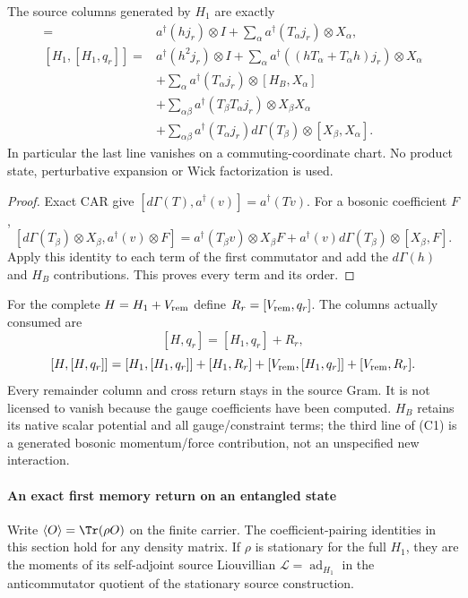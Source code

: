 \documentclass[12pt,a4paper]{article}
\begin{document}
\begin{theorem}
\label{p4:thm:v2168-bilinear-source-commutators}
The source columns generated by $H_1$ are exactly
\begin{align*}
 [H_1,q_r]={}&a^\dagger(hj_r)\otimes I
       +\sum_\alpha a^\dagger(T_\alpha j_r)\otimes X_\alpha,\\
 [H_1,[H_1,q_r]]={}&a^\dagger(h^2j_r)\otimes I
       +\sum_\alpha a^\dagger((hT_\alpha+T_\alpha h)j_r)
                   \otimes X_\alpha\\
 &+\sum_\alpha a^\dagger(T_\alpha j_r)\otimes[H_B,X_\alpha]\\
 &+\sum_{\alpha\beta}a^\dagger(T_\beta T_\alpha j_r)
                   \otimes X_\beta X_\alpha\\
 &+\sum_{\alpha\beta}a^\dagger(T_\alpha j_r)d\Gamma(T_\beta)
                   \otimes[X_\beta,X_\alpha].
 \tag{C1}
\end{align*}
In particular the last line vanishes on a commuting-coordinate chart.
No product state, perturbative expansion or Wick factorization is used.
\end{theorem}
\begin{proof}
Exact CAR give
$[d\Gamma(T),a^\dagger(v)]=a^\dagger(Tv)$. For a bosonic coefficient $F$,
\[
 [d\Gamma(T_\beta)\otimes X_\beta,
             a^\dagger(v)\otimes F]
 =a^\dagger(T_\beta v)\otimes X_\beta F
  +a^\dagger(v)d\Gamma(T_\beta)\otimes[X_\beta,F].
\]
Apply this identity to each term of the first commutator and add the
$d\Gamma(h)$ and $H_B$ contributions. This proves every term and its order.
\end{proof}

For the complete $H=H_1+V_{\rm rem}$ define
$R_r=[V_{\rm rem},q_r]$. The columns actually consumed are
\[
 [H,q_r]=[H_1,q_r]+R_r,
\]
\[
 [H,[H,q_r]]=[H_1,[H_1,q_r]]+[H_1,R_r]
       +[V_{\rm rem},[H_1,q_r]]+[V_{\rm rem},R_r].
\]
Every remainder column and cross return stays in the source Gram. It is
not licensed to vanish because the gauge coefficients have been computed.
$H_B$ retains its native scalar potential and all gauge/constraint terms;
the third line of (C1) is a generated bosonic momentum/force contribution,
not an unspecified new interaction.



\paragraph{An exact first memory return on an entangled state}
Write $\langle O\rangle=\Tr(\rho O)$ on the finite carrier. The coefficient-pairing
identities in this section hold for any density matrix. If $\rho$ is
stationary for the full $H_1$, they are the moments of its self-adjoint
source Liouvillian $\mathcal L=\operatorname{ad}_{H_1}$ in the anticommutator quotient
of the stationary source construction.
\end{document}
